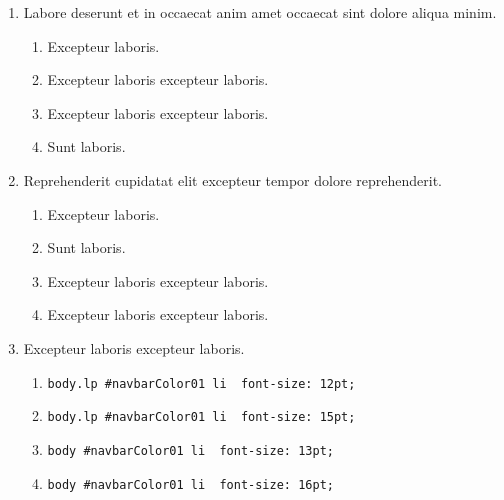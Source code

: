 \documentclass[a4paper,12pt]{article}
\begin{document}
\begin{enumerate}[label=\textbf{\arabic*.}]
\begin{enumerate}
	\end{enumerate}

\item Labore deserunt et in occaecat anim amet occaecat sint dolore aliqua minim.
\begin{multicols}{2}
	\begin{enumerate}
		\item  Excepteur laboris.
    
		\item  Excepteur laboris excepteur laboris.
    
		\item  Excepteur laboris excepteur laboris.
  
		\item  Sunt laboris.
    
	\end{enumerate}

\end{multicols}
\item Reprehenderit cupidatat elit excepteur tempor dolore reprehenderit.
\begin{multicols}{2}
	\begin{enumerate}
		\item  Excepteur laboris.
    
		\item  Sunt laboris.
    
		\item  Excepteur laboris excepteur laboris.
    
		\item  Excepteur laboris excepteur laboris.
  
	\end{enumerate}

\end{multicols}
\item Excepteur laboris excepteur laboris.
	\begin{enumerate}
		\item  \texttt{body.lp \#navbarColor01 li { font-size: 12pt; }}
    
		\item  \texttt{body.lp \#navbarColor01 li { font-size: 15pt; }}
    
		\item  \texttt{body \#navbarColor01 li { font-size: 13pt; }}
    
		\item  \texttt{body \#navbarColor01 li { font-size: 16pt; }}
  
	\end{enumerate}


\end{enumerate}
\end{document}
